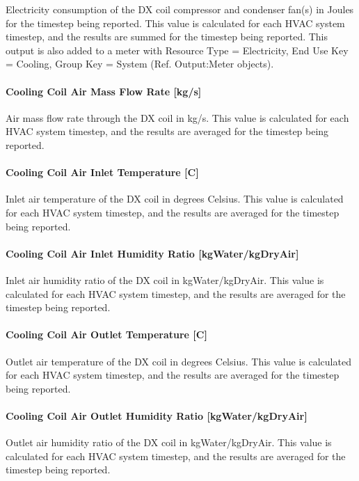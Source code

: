 Electricity consumption of the DX coil compressor and condenser fan(s) in Joules for the timestep being reported. This value is calculated for each HVAC system timestep, and the results are summed for the timestep being reported. This output is also added to a meter with Resource Type = Electricity, End Use Key = Cooling, Group Key = System (Ref. Output:Meter objects).

\paragraph{Cooling Coil Air Mass Flow Rate {[}kg/s{]}}

Air mass flow rate through the DX coil in kg/s. This value is calculated for each HVAC system timestep, and the results are averaged for the timestep being reported.

\paragraph{Cooling Coil Air Inlet Temperature {[}C{]}}

Inlet air temperature of the DX coil in degrees Celsius. This value is calculated for each HVAC system timestep, and the results are averaged for the timestep being reported.

\paragraph{Cooling Coil Air Inlet Humidity Ratio {[}kgWater/kgDryAir{]}}

Inlet air humidity ratio of the DX coil in kgWater/kgDryAir. This value is calculated for each HVAC system timestep, and the results are averaged for the timestep being reported.

\paragraph{Cooling Coil Air Outlet Temperature {[}C{]}}

Outlet air temperature of the DX coil in degrees Celsius. This value is calculated for each HVAC system timestep, and the results are averaged for the timestep being reported.

\paragraph{Cooling Coil Air Outlet Humidity Ratio {[}kgWater/kgDryAir{]}}

Outlet air humidity ratio of the DX coil in kgWater/kgDryAir. This value is calculated for each HVAC system timestep, and the results are averaged for the timestep being reported.


